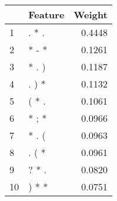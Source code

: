 \begin{tabular}{llr}
\toprule
{} & Feature &  Weight \\
\midrule
1  &   . * . &  0.4448 \\
2  &   * - * &  0.1261 \\
3  &   * . ) &  0.1187 \\
4  &   . ) * &  0.1132 \\
5  &   ( * . &  0.1061 \\
6  &   * ; * &  0.0966 \\
7  &   * . ( &  0.0963 \\
8  &   . ( * &  0.0961 \\
9  &   ? * . &  0.0820 \\
10 &   ) * * &  0.0751 \\
\bottomrule
\end{tabular}
